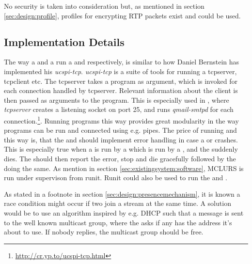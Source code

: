 \noindent{}No security is taken into consideration but, as mentioned in section \ref{sec:design:profile}, profiles for encrypting RTP packets exist and could be used.

\subsection{Implementation Details}

The way a \pub{} and a \sub{} run a \pro{} and \con{} respectively, is similar to how Daniel Bernstein has implemented his \textit{ucspi-tcp}. \textit{ucspi-tcp} is a suite of tools for running a tcpserver, tcpclient etc. The tcpserver takes a program as argument, which is invoked for each connection handled by tcpserver. Relevant information about the client is then passed as arguments to the program. This is especially used in  , where \textit{tcpserver} creates a listening socket on port 25, and runs \textit{qmail-smtpd} for each connection.\footnote{\url{http://cr.yp.to/ucspi-tcp.html}}. Running programs this way provides great modularity in the way programs can be run and connected using e.g. pipes. The price of running \pros{} and \cons{} this way is, that the \sub{} and \pub{} should implement error handling in case a \con{} or \pro{} crashes. This is especially true when a  is run by a \pub{} which is run by a \sub{}, and the  suddenly dies. The \pub{} should then report the error, stop and die gracefully followed by the \sub{} doing the same. As mention in section \ref{sec:existingsystem:software}, MCLURS is run under supervison from runit. Runit could also be used to run the \sub{} and \pub{}. 


\noindent{}As stated in a footnote in section \ref{sec:design:presencemechanism}, it is known a race condition might occur if two \pubs{} join a stream at the same time. A solution would be to use an algorithm inspired by e.g. \ac{DHCP} such that a message is sent to the well known multicast group, where the \pub{} asks if any has the address it's about to use. If nobody replies, the multicast group should be free.


